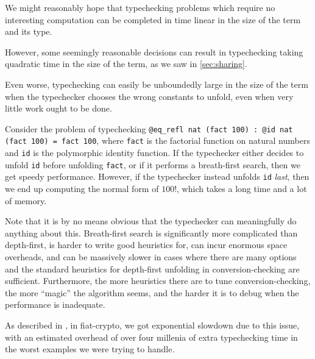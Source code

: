 We might reasonably hope that typechecking problems which require no interesting computation can be completed in time linear in the size of the term and its type.

However, some seemingly reasonable decisions can result in typechecking taking quadratic time in the size of the term, as we saw in \autoref{sec:sharing}.


Even worse, typechecking can easily be unboundedly large in the size of the term when the typechecker chooses the wrong constants to unfold, even when very little work ought to be done.


Consider the problem of typechecking \texttt{@eq_refl nat (fact 100) : @id nat (fact 100) = fact 100}, where \texttt{fact} is the factorial function on natural numbers and \texttt{id} is the polymorphic identity function.
If the typechecker either decides to unfold \texttt{id} before unfolding \texttt{fact}, or if it performs a breath-first search, then we get speedy performance.
However, if the typechecker instead unfolds \texttt{id} \emph{last}, then we end up computing the normal form of $100!$, which takes a long time and a lot of memory.


Note that it is by no means obvious that the typechecker can meaningfully do anything about this.
Breath-first search is significantly more complicated than depth-first, is harder to write good heuristics for, can incur enormous space overheads, and can be massively slower in cases where there are many options and the standard heuristics for depth-first unfolding in conversion-checking are sufficient.
Furthermore, the more heuristics there are to tune conversion-checking, the more ``magic'' the algorithm seems, and the harder it is to debug when the performance is inadequate.

As described in , in fiat-crypto, we got exponential slowdown due to this issue, with an estimated overhead of over four millenia of extra typechecking time in the worst examples we were trying to handle.


